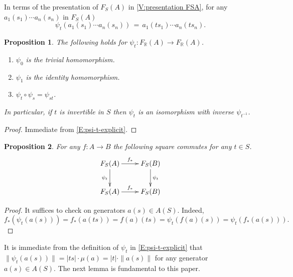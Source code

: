 \documentclass[12pt]{amsart}
\newtheorem{prop}{Proposition}[section]
\theoremstyle{definition}
\def\RR{\ensuremath{\mathbb{R}}}
\def\Free{F}
\begin{document}
In terms of the presentation of $\Free_S(A)$ in \ref{V:presentation FSA}, for any $a_1(s_1) \cdots a_n(s_n)$ in $\Free_S(A)$
\begin{equation}\label{E:psi-t-explicit}
\psi_t \left( a_1(s_1) \cdots a_n(s_n) \right) \, = \,  a_1(ts_1) \cdots a_n(ts_n).
\end{equation}




\begin{prop}\label{P:psit monoidal properties}
The following holds for $\psi_t \colon \Free_\RR(A) \to \Free_\RR(A)$.
\begin{enumerate}[label=(\roman*)]
\item $\psi_0$ is the trivial homomorphism.
\item $\psi_1$ is the identity homomorphism.
\item $\psi_t \circ \psi_s = \psi_{st}$.
\end{enumerate}
In particular, if $t$ is invertible in $S$ then $\psi_t$ is an isomorphism with inverse $\psi_{t^{-1}}$.
\end{prop}

\begin{proof}
Immediate from \eqref{E:psi-t-explicit}.
\end{proof}












\begin{prop}\label{P:psit commutes with fstar}
For any $f \colon A \to B$  the following square commutes for any $t \in S$.
\[
\xymatrix{
\Free_S(A) \ar[r]^{f_*} \ar[d]_{\psi_t} &
\Free_S(B) \ar[d]^{\psi_t} 
\\
\Free_S(A) \ar[r]^{f_*} &
\Free_S(B)  
}
\]
\end{prop}

\begin{proof}
It suffices to check on generators $a(s) \in A(S)$.
Indeed, 
\[
f_*(\psi_t(a(s))) = f_*(a(ts))=f(a)(ts) =\psi_t(f(a)(s)) = \psi_t(f_*(a(s))).
\]
\end{proof}





It is immediate from the definition of $\psi_t$ in \eqref{E:psi-t-explicit} that $\| \psi_t(a(s))\| = |ts| \cdot \mu(a) = |t| \cdot \| a(s)\|$ for any generator $a(s) \in A(S)$.
The next lemma is fundamental to this paper.
\end{document}
